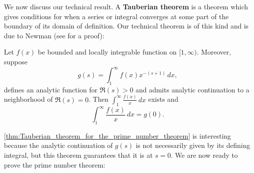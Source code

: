      We now discuss our technical result. A \textbf{Tauberian theorem} is a theorem which gives conditions for when a series or integral converges at some part of the boundary of its domain of definition. Our technical theorem is of this kind and is due to Newman (see \cite{vatwani2015simple} for a proof):

      \begin{theorem}\label{thm:Tauberian_theorem_for_the_prime_number_theorem}
        Let $f(x)$ be bounded and locally integrable function on $[1,\infty)$. Moreover, suppose
        \[
          g(s) = \int_{1}^{\infty}f(x)x^{-(s+1)}\,dx,
        \]
        defines an analytic function for $\Re(s) > 0$ and admits analytic continuation to a neighborhood of $\Re(s) = 0$. Then $\int_{1}^{\infty}\frac{f(x)}{x}\,dx$ exists and
        \[
          \int_{1}^{\infty}\frac{f(x)}{x}\,dx = g(0).
        \]
      \end{theorem}

      \cref{thm:Tauberian_theorem_for_the_prime_number_theorem} is interesting because the analytic continuation of $g(s)$ is not necessarily given by its defining integral, but this theorem guarantees that it is at $s = 0$. We are now ready to prove the prime number theorem:

